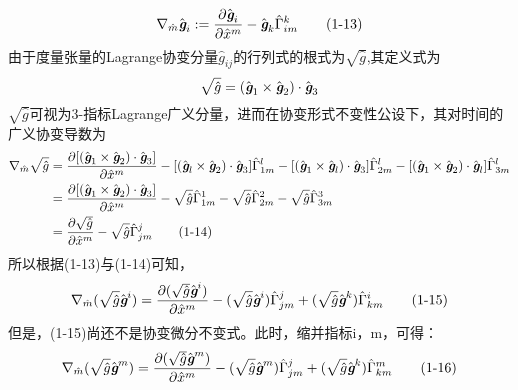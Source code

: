 \documentclass[UTF8]{ctexart}
\begin{document}
\begin{equation*}
     \nabla_{\hat{m}} \hat{\textit{\textbf{g}}}_i := \frac{\partial \hat{\textit{\textbf{g}}}_i}{\partial \hat{x}^m}-\hat{\textit{\textbf{g}}}_k \hat{\Gamma }_{im}^{k} 
     \tag{1-13}
\end{equation*}
由于度量张量的Lagrange协变分量$\hat{g}_{ij}$的行列式的根式为$\sqrt{\hat{g}}$,其定义式为
\begin{equation*}
    \sqrt{\hat{g}}=(\hat{\textit{\textbf{g}}}_1 \times \hat{\textit{\textbf{g}}}_2 )\cdot \hat{\textit{\textbf{g}}}_3
\end{equation*}
$\sqrt{\hat{g}}$可视为3-指标Lagrange广义分量，进而在协变形式不变性公设下，其对时间的广义协变导数为
\begin{align*}
    \nabla_{\hat{m}}\sqrt{\hat{g}}&= \frac{\partial[(\hat{\textit{\textbf{g}}}_1 \times \hat{\textit{\textbf{g}}}_2 )\cdot \hat{\textit{\textbf{g}}}_3]}{\partial \hat{x}^m}-[(\hat{\textit{\textbf{g}}}_l \times \hat{\textit{\textbf{g}}}_2 )\cdot \hat{\textit{\textbf{g}}}_3]\hat{\Gamma }_{1m}^{l}  -[(\hat{\textit{\textbf{g}}}_1 \times \hat{\textit{\textbf{g}}}_l )\cdot \hat{\textit{\textbf{g}}}_3]\hat{\Gamma }_{2m}^{l}  -[(\hat{\textit{\textbf{g}}}_1 \times \hat{\textit{\textbf{g}}}_2 )\cdot \hat{\textit{\textbf{g}}}_l]\hat{\Gamma }_{3m}^{l} \\
    &=\frac{\partial [(\hat{\textit{\textbf{g}}}_1 \times \hat{\textit{\textbf{g}}}_2 )\cdot \hat{\textit{\textbf{g}}}_3]}{\partial \hat{x}^m}-\sqrt{\hat{g}}\hat{\Gamma }_{1m}^1 -\sqrt{\hat{g}}\hat{\Gamma }_{2m}^2 -\sqrt{\hat{g}}\hat{\Gamma }_{3m}^3 \\
    &=\frac{\partial \sqrt{\hat{g}}}{\partial \hat{x}^m}-\sqrt{\hat{g}}\hat{\Gamma }_{jm}^j \tag{1-14}
\end{align*}
所以根据(1-13)与(1-14)可知，
\begin{equation*}
    \nabla_{\hat{m}}(\sqrt{\hat{g}}\hat{\textit{\textbf{g}}}^i)=\frac{\partial (\sqrt{\hat{g}}\hat{\textit{\textbf{g}}}^i)}{\partial \hat{x}^m}-(\sqrt{\hat{g}}\hat{\textit{\textbf{g}}}^i)\hat{\Gamma }_{jm}^j+(\sqrt{\hat{g}}\hat{\textit{\textbf{g}}}^k)\hat{\Gamma }_{km}^i\tag{1-15}
\end{equation*}
但是，(1-15)尚还不是协变微分不变式。此时，缩并指标i，m，可得：
\begin{equation*}
     \nabla_{\hat{m}}(\sqrt{\hat{g}}\hat{\textit{\textbf{g}}}^m)=\frac{\partial (\sqrt{\hat{g}}\hat{\textit{\textbf{g}}}^m)}{\partial \hat{x}^m}-(\sqrt{\hat{g}}\hat{\textit{\textbf{g}}}^m)\hat{\Gamma }_{jm}^j+ (\sqrt{\hat{g}}\hat{\textit{\textbf{g}}}^k)\hat{\Gamma }_{km}^m\tag{1-16}
\end{equation*}
\end{document}
